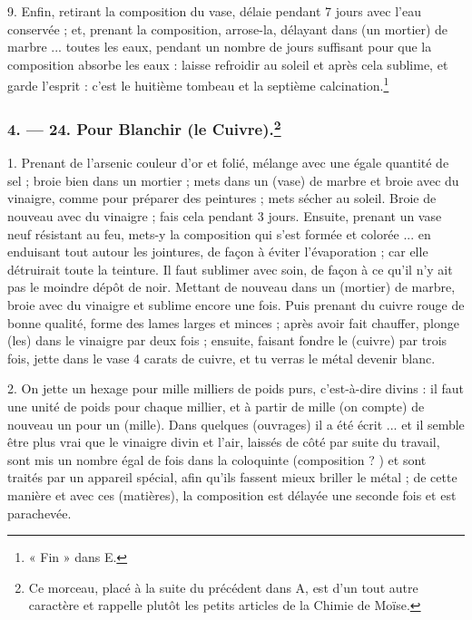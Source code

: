 \documentclass[a4paper, 11pt, oneside, polutonikogreek, french]{article}
\begin{document}
9. Enfin, retirant la composition du vase, délaie pendant 7 jours avec l'eau conservée ; et, prenant la composition, arrose-la, délayant dans (un mortier) de marbre ... toutes les eaux, pendant un nombre de jours suffisant pour que la composition absorbe les eaux : laisse refroidir au soleil et après cela sublime, et garde l'esprit : c'est le huitième tombeau et la septième calcination.\footnote{« Fin » dans E.}

\bigskip
\centerline{\EightStarTaper}
\centerline{\EightStarTaper\EightStarTaper}
\bigskip

\subsubsection[4. --- 24. Pour Blanchir (le Cuivre).]{4. --- 24. Pour Blanchir (le Cuivre).\footnote{Ce morceau, placé à la suite du précédent dans A, est d'un tout autre caractère et rappelle plutôt les petits articles de la Chimie de Moïse.}}

1. Prenant de l'arsenic couleur d'or et folié, mélange avec une égale quantité de sel ; broie bien dans un mortier ; mets dans un (vase) de marbre et broie avec du vinaigre, comme pour préparer des peintures ; mets sécher au soleil. Broie de nouveau avec du vinaigre ; fais cela pendant 3 jours. Ensuite, prenant un vase neuf résistant au feu, mets-y la composition qui s'est formée et colorée ... en enduisant tout autour les jointures, de façon à éviter l'évaporation ; car elle détruirait toute la teinture. Il faut sublimer avec soin, de façon à ce qu'il n'y ait pas le moindre dépôt de noir. Mettant de nouveau dans un (mortier) de marbre, broie avec du vinaigre et sublime encore une fois. Puis prenant du cuivre rouge de bonne qualité, forme des lames larges et minces ; après avoir fait chauffer, plonge (les) dans le vinaigre par deux fois ; ensuite, faisant fondre le (cuivre) par trois fois, jette dans le vase 4 carats de cuivre, et tu verras le métal devenir blanc.

2. On jette un hexage pour mille milliers de poids purs, c'est-à-dire divins : il faut une unité de poids pour chaque millier, et à partir de mille (on compte) de nouveau un pour un (mille). Dans quelques (ouvrages) il a été écrit ... et il semble être plus vrai que le vinaigre divin et l'air, laissés de côté par suite du travail, sont mis un nombre égal de fois dans la coloquinte (composition ? ) et sont traités par un appareil spécial, afin qu'ils fassent mieux briller le métal ; de cette manière et avec ces (matières), la composition est délayée une seconde fois et est parachevée.
\end{document}
